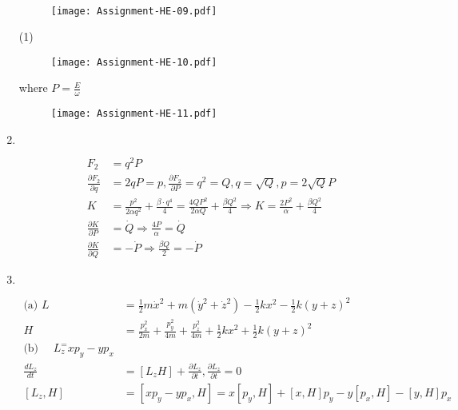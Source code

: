 \begin{enumerate}
\begin{answer}
\begin{align*}
	\end{align*}
	\begin{figure}[H]
		\centering
		\texttt{[image: Assignment-HE-09.pdf]}
	\end{figure}
 \begin{tasks}(1)
	\task[\text{(d)}] 
	\begin{figure}[H]
		\centering
		\texttt{[image: Assignment-HE-10.pdf]}
	\end{figure}where $P=\frac{E}{\omega}$
	\task[\text{(e)}] 
		\begin{figure}[H]
		\centering
		\texttt{[image: Assignment-HE-11.pdf]}
	\end{figure}
\end{tasks}
\end{answer}
	\item $\left. \right. $
	\begin{answer}
		\begin{align*}
		F_{2}&=q^{2} P\\
		\frac{\partial F_{2}}{\partial q}&=2 q P=p, \frac{\partial F_{2}}{\partial P}=q^{2}=Q, q=\sqrt{Q}, p=2 \sqrt{Q} P\\
		K&=\frac{p^{2}}{2 \alpha q^{2}}+\frac{\beta \cdot q^{4}}{4}=\frac{4 Q P^{2}}{2 \alpha Q}+\frac{\beta Q^{2}}{4} \Rightarrow K=\frac{2 P^{2}}{\alpha}+\frac{\beta Q^{2}}{4}\\
		\frac{\partial K}{\partial P}&=\dot{Q} \Rightarrow \frac{4 P}{\alpha}=\dot{Q}\\
		\frac{\partial K}{\partial Q}&=-\dot{P} \Rightarrow \frac{\beta Q}{2}=-\dot{P}
		\end{align*}
	\end{answer}
	\item $\left. \right. $
	\begin{answer}
		\begin{align*}
		\text{(a) }L&=\frac{1}{2} m \dot{x}^{2}+m\left(\dot{y}^{2}+\dot{z}^{2}\right)-\frac{1}{2} k x^{2}-\frac{1}{2} k(y+z)^{2}\\
		H&=\frac{p_{x}^{2}}{2 m}+\frac{p_{y}^{2}}{4 m}+\frac{p_{z}^{2}}{4 m}+\frac{1}{2} k x^{2}+\frac{1}{2} k(y+z)^{2}\\
		\text{(b) }\quad L_{z}^=x p_{y}-y p_{x}\\
		\frac{d L_{z}}{d t}&=\left[L_{z} H\right]+\frac{\partial L_{z}}{\partial t}, \frac{\partial L_{z}}{\partial t}=0\\
		\left[L_{z}, H\right]&=\left[x p_{y}-y p_{x}, H\right]=x\left[p_{y}, H\right]+[x, H] p_{y}-y\left[p_{x}, H\right]-[y, H] p_{x} \\

\end{align*}
\end{answer}
\end{enumerate}
